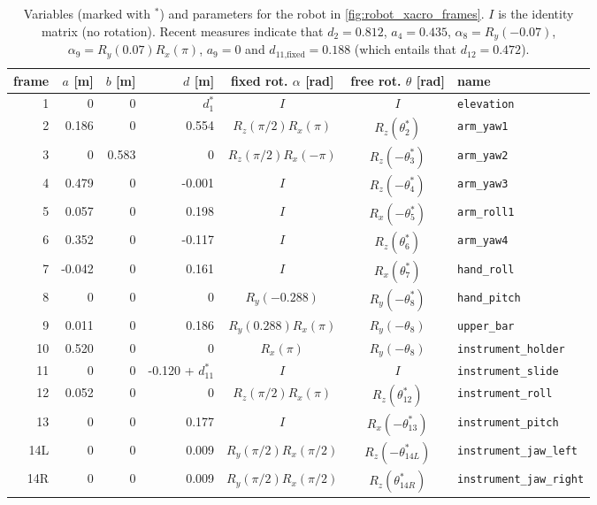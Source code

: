 \begin{table}[htbp]
	\begin{tabular}{r | rrr c c l}
		frame  & $a$ [m] & $b$ [m] & $d$ [m] & fixed rot. $\alpha$ [rad] & free rot. $\theta$ [rad] & name\\\hline
		1 & 0 & 0 & $d_1^*$ & $I$ & $I$ & \texttt{elevation}\\
		2 & 0.186 & 0 & 0.554 & $R_z(\pi/2)R_x(\pi)$ & $R_z(\theta_2^*)$ & \texttt{arm\_yaw1} \\
		3 & 0 & 0.583 & 0 & $R_z(\pi/2)R_x(-\pi)$ & $R_z(-\theta_3^*)$ & \texttt{arm\_yaw2} \\
		4 & 0.479 & 0 & -0.001 & $I$ & $R_z(-\theta_4^*)$ & \texttt{arm\_yaw3} \\
		5 & 0.057 & 0 & 0.198 & $I$ & $R_x(-\theta_5^*)$ & \texttt{arm\_roll1} \\
		6 & 0.352 & 0 & -0.117 & $I$ & $R_z(\theta_6^*)$ & \texttt{arm\_yaw4} \\
		7 & -0.042 & 0 & 0.161 & $I$ & $R_x(\theta_7^*)$ & \texttt{hand\_roll} \\
		8 & 0 & 0 & 0 & $R_y(-0.288)$ & $R_y(-\theta_8^*)$ & \texttt{hand\_pitch} \\
		9 & 0.011 & 0 & 0.186 & $R_y(0.288)R_x(\pi)$ & $R_y(-\theta_8)$ & \texttt{upper\_bar} \\
		10 & 0.520 & 0 & 0 & $R_x(\pi)$ & $R_y(-\theta_8)$ & \texttt{instrument\_holder} \\
		11 & 0 & 0 & -0.120 + $d_{11}^*$ & $I$ & $I$ & \texttt{instrument\_slide} \\
		12 & 0.052 & 0 & 0 & $R_z(\pi/2)R_x(\pi)$ & $R_z(\theta_{12}^*)$ & \texttt{instrument\_roll} \\
		13 & 0 & 0 & 0.177 & $I$ & $R_x(-\theta_{13}^*)$ & \texttt{instrument\_pitch} \\
		14L & 0 & 0 & 0.009 & $R_y(\pi/2)R_x(\pi/2)$ & $R_z(-\theta_{14L}^*)$ & \texttt{instrument\_jaw\_left} \\
		14R & 0 & 0 & 0.009 & $R_y(\pi/2)R_x(\pi/2)$ & $R_z(\theta_{14R}^*)$ & \texttt{instrument\_jaw\_right} \\
	\end{tabular}
	\caption{Variables (marked with $^*$) and parameters for the robot in \autoref{fig:robot_xacro_frames}. $I$ is the identity matrix (no rotation). Recent measures indicate that $d_2=0.812$, $a_4=0.435$, $\alpha_8=R_y(-0.07)$, $\alpha_9=R_y(0.07)R_x(\pi)$, $a_9=0$ and $d_\text{11,fixed}=0.188$ (which entails that $d_{12}=0.472$).}
	\label{tab:xacro_param}
\end{table}


